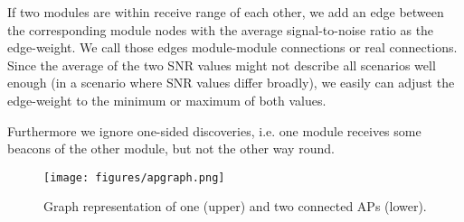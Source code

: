     If two modules are within receive range of each other, 
    we add an edge between the corresponding module nodes with the average signal-to-noise ratio as the edge-weight.
    We call those edges module-module connections or real connections.
    Since the average of the two \ac{SNR} values might not describe all scenarios well enough (in a scenario where \ac{SNR} values differ broadly),
    we easily can adjust the edge-weight to the minimum or maximum of both values.
    
    Furthermore we ignore one-sided discoveries, i.e. one module receives some beacons of the other module, but not the other way round.
        
    \begin{figure}[th!]
      \centering
      \texttt{[image: figures/apgraph.png]}
      \caption{Graph representation of one (upper) and two connected APs (lower).}
      \label{fig:apgraph}
    \end{figure}
